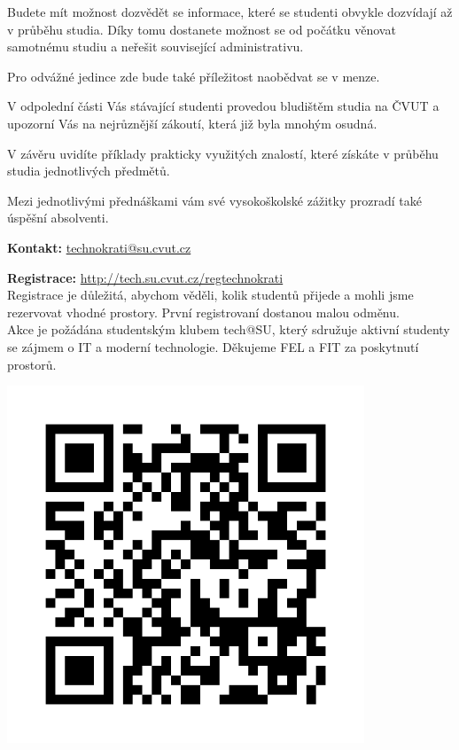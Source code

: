 \documentclass[12pt]{extarticle}[10.3.2013]
\newcommand{\B}[1]{\textbf{{#1}}}
\begin{document}
Budete mít možnost dozvědět se informace, které se studenti obvykle
dozvídají až v průběhu studia. Díky tomu dostanete možnost se od
počátku věnovat samotnému studiu a neřešit související administrativu.


Pro odvážné jedince zde bude také příležitost naobědvat se v menze.

V odpolední části Vás stávající studenti provedou bludištěm studia na
ČVUT a upozorní Vás na nejrůznější zákoutí, která již byla mnohým osudná.

V závěru uvidíte příklady prakticky využitých znalostí, které získáte v
průběhu studia jednotlivých předmětů.

Mezi jednotlivými přednáškami vám své vysokoškolské zážitky prozradí
také úspěšní absolventi.

\vspace{3em}

\begin{minipage}[c]{0.5\textwidth}
\B{Kontakt:} \href{mailto:technokrati@su.cvut.cz}{technokrati@su.cvut.cz}

\B{Registrace:} \href{http://tech.su.cvut.cz/regtechnokrati}{http://tech.su.cvut.cz/regtechnokrati} \\
Registrace je důležitá, abychom věděli, kolik studentů přijede a mohli jsme rezervovat vhodné prostory. První registrovaní dostanou malou odměnu. \\

Akce je požádána studentským klubem tech@SU, který sdružuje aktivní studenty se zájmem o IT a moderní technologie. Děkujeme FEL a FIT za poskytnutí prostorů.
\end{minipage}
\begin{minipage}[c]{0.5\textwidth}
\begin{center}
	{\includegraphics[width=0.8\textwidth]{reg-odkaz.png}}
\end{center}
\end{minipage}
\end{document}

